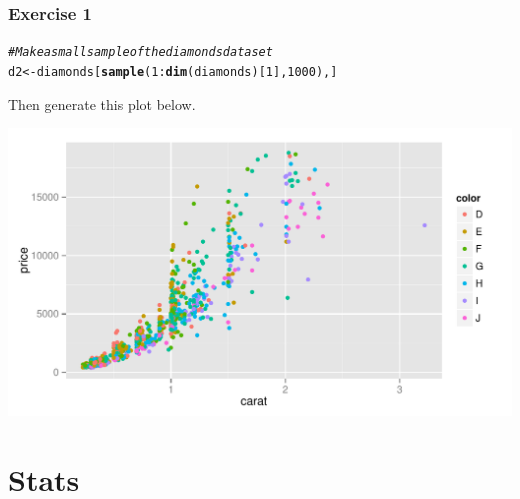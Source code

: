 \documentclass{beamer}\usepackage[]{graphicx}\usepackage[]{color}
\makeatletter
\newcommand{\hlnum}[1]{\textcolor[rgb]{0.686,0.059,0.569}{#1}}%
\newcommand{\hlcom}[1]{\textcolor[rgb]{0.678,0.584,0.686}{\textit{#1}}}%
\newcommand{\hlopt}[1]{\textcolor[rgb]{0,0,0}{#1}}%
\newcommand{\hlstd}[1]{\textcolor[rgb]{0.345,0.345,0.345}{#1}}%
\newcommand{\hlkwb}[1]{\textcolor[rgb]{0.69,0.353,0.396}{#1}}%
\newcommand{\hlkwd}[1]{\textcolor[rgb]{0.737,0.353,0.396}{\textbf{#1}}}%
\newenvironment{kframe}{%
 \def\at@end@of@kframe{}%
 \ifinner\ifhmode%
  \def\at@end@of@kframe{\end{minipage}}%
  \begin{minipage}{\columnwidth}%
 \fi\fi%
 \def\FrameCommand##1{\hskip\@totalleftmargin \hskip-\fboxsep
 \colorbox{shadecolor}{##1}\hskip-\fboxsep
     \hskip-\linewidth \hskip-\@totalleftmargin \hskip\columnwidth}%
 \MakeFramed {\advance\hsize-\width
   \@totalleftmargin\z@ \linewidth\hsize
   \@setminipage}}%
 {\par\unskip\endMakeFramed%
 \at@end@of@kframe}
\newenvironment{knitrout}{}{} %
\makeatother
\begin{document}
\begin{frame}[fragile]
\frametitle{Exercise 1}
\begin{knitrout}\footnotesize
{}\color{fgcolor}\begin{kframe}
\begin{alltt}
\hlcom{# Make a small sample of the diamonds dataset}
\hlstd{d2} \hlkwb{<-} \hlstd{diamonds[}\hlkwd{sample}\hlstd{(}\hlnum{1}\hlopt{:}\hlkwd{dim}\hlstd{(diamonds)[}\hlnum{1}\hlstd{],} \hlnum{1000}\hlstd{), ]}
\end{alltt}
\end{kframe}
\end{knitrout}

Then generate this plot below.

\begin{knitrout}\footnotesize
{}\color{fgcolor}

{\centering \includegraphics[width=.75\linewidth]{figure/ex1} 

}



\end{knitrout}

\end{frame}


\section*{Stats}
\frame{\sectionpage}

\end{document}
